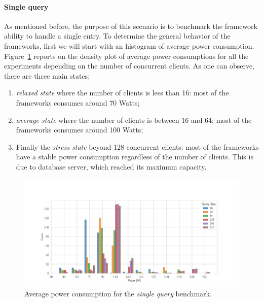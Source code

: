 \paragraph{Single query}
As mentioned before, the purpose of this scenario is to benchmark the framework ability to handle a single entry.
To determine the general behavior of the frameworks, first we will start with an histogram of average power consumption.
Figure~\ref{fig:av_power_db} reports on the  density plot of average power consumptions for all the experiments depending on the number of concurrent clients.
As one can observe, there are three main states:
\begin{enumerate}
    \item \emph{relaxed state} where the number of clients is less than 16: most of the frameworks consumes around 70 Watts;
    \item \emph{average state} where the number of clients is between 16 and 64: most of the frameworks consumes around 100 Watts;
    \item Finally the \emph{stress state} beyond 128 concurrent clients: most of the frameworks  have a stable power consumption regardless of the number of clients.
    This is due to database server, which reached its maximum capacity.
\end{enumerate}

\begin{figure}[hbt]
    \centering
    \includegraphics[width=
        \columnwidth]{imgs/histogram_av_power_cpu_db}
    \caption{Average power consumption for the \emph{single query} benchmark.}
    \label{fig:av_power_db}
\end{figure}

